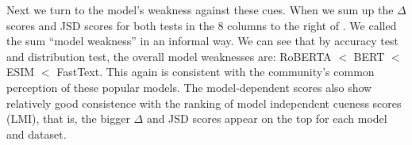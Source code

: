 % 
%



Next we turn to the model's weakness against these cues.
When we sum up the $\Delta$ scores and JSD scores for both tests
in the 8 columns to the right of . 
We called the sum ``model weakness'' in an informal way.
We can see that by accuracy test and distribution test,
the overall model weaknesses are:  
RoBERTA $<$ BERT $<$ ESIM $<$ FastText. 
This again is consistent with 
the community's common perception of these popular models.
The model-dependent scores also show relatively good consistence with
the ranking of model independent cueness scores (LMI), that is, the
bigger $\Delta$ and JSD scores appear on the top for each model and dataset.

%

